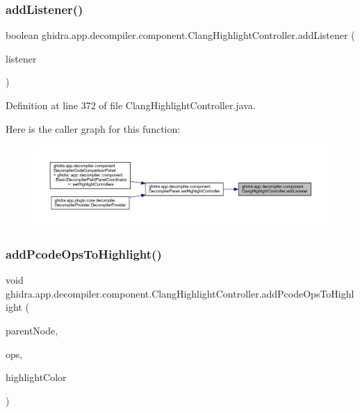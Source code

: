 \subsubsection{\texorpdfstring{addListener()}{addListener()}}
{\footnotesize\ttfamily boolean ghidra.\+app.\+decompiler.\+component.\+Clang\+Highlight\+Controller.\+add\+Listener (\begin{DoxyParamCaption}\item[{\mbox{\hyperlink{interfaceghidra_1_1app_1_1decompiler_1_1component_1_1_clang_highlight_listener}{Clang\+Highlight\+Listener}}}]{listener }\end{DoxyParamCaption})\hspace{0.3cm}{\ttfamily [inline]}}



Definition at line 372 of file Clang\+Highlight\+Controller.\+java.

Here is the caller graph for this function\+:
\nopagebreak
\begin{figure}[H]
\begin{center}
\leavevmode
\includegraphics[width=350pt]{classghidra_1_1app_1_1decompiler_1_1component_1_1_clang_highlight_controller_a1f995ddaa7172fc70cffc4f408882c05_icgraph}
\end{center}
\end{figure}
\mbox{\label{classghidra_1_1app_1_1decompiler_1_1component_1_1_clang_highlight_controller_a999122a27059713e3033e404e204e20f}} 
\subsubsection{\texorpdfstring{addPcodeOpsToHighlight()}{addPcodeOpsToHighlight()}}
{\footnotesize\ttfamily void ghidra.\+app.\+decompiler.\+component.\+Clang\+Highlight\+Controller.\+add\+Pcode\+Ops\+To\+Highlight (\begin{DoxyParamCaption}\item[{\mbox{\hyperlink{interfaceghidra_1_1app_1_1decompiler_1_1_clang_node}{Clang\+Node}}}]{parent\+Node,  }\item[{Set$<$ \mbox{\hyperlink{class_pcode_op}{Pcode\+Op}} $>$}]{ops,  }\item[{Color}]{highlight\+Color }\end{DoxyParamCaption})\hspace{0.3cm}{\ttfamily [inline]}}




